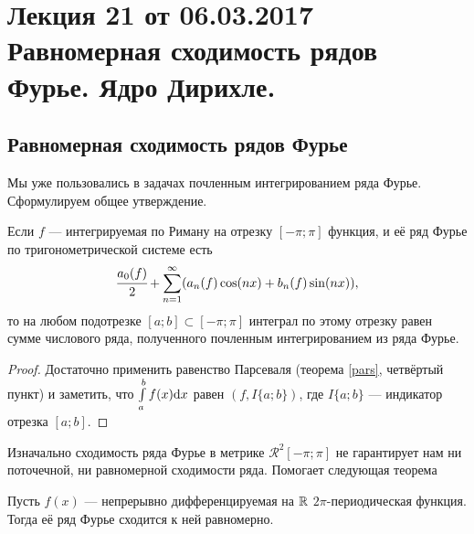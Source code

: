 \pagestyle{fancy}
\section{Лекция 21 от 06.03.2017 \\ Равномерная сходимость рядов Фурье. Ядро Дирихле.}
\subsection{Равномерная сходимость рядов Фурье}
Мы уже пользовались в задачах почленным интегрированием ряда Фурье. Сформулируем общее утверждение.
\begin{Statement}
	Если $f$ --- интегрируемая по Риману на отрезку $[-\pi;\pi]$  функция, и её ряд Фурье по тригонометрической системе есть
	$$
		\cfrac{a_0(f)}{2} + \sum\limits_{n=1}^{\infty}(a_n(f)\cos(nx) + b_n(f)\sin(nx)),
	$$
	 то на любом подотрезке $[a;b] \subset [-\pi; \pi]$ интеграл по этому отрезку равен сумме числового ряда, полученного почленным интегрированием из ряда Фурье.
\end{Statement}
\begin{proof}
    Достаточно применить равенство Парсеваля (теорема \ref{pars}, четвёртый пункт) и заметить, что $\int\limits_a^bf(x)\mathrm{d}x$ равен $(f, I\{a; b\})$, где $I\{a; b\}$ --- индикатор отрезка $[a; b]$.
\end{proof}
Изначально сходимость ряда Фурье в метрике $\mathcal{R}^2[-\pi; \pi]$ не гарантирует нам ни поточечной, ни равномерной сходимости ряда. Помогает следующая теорема
\begin{Theorem}
	Пусть $f(x)$ --- непрерывно дифференцируемая на $\mathbb{R}$ $2\pi$-периодическая функция. Тогда её ряд Фурье сходится к ней равномерно.
\end{Theorem}
